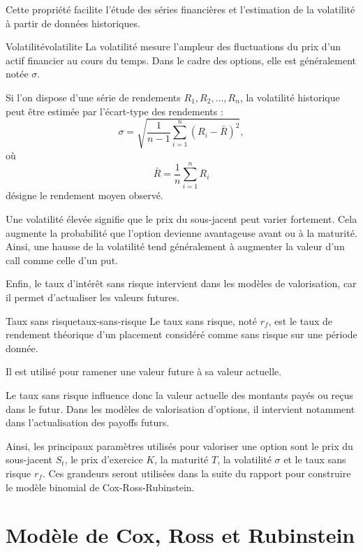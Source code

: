 \documentclass[11pt]{report}
\begin{document}
Cette propriété facilite l'étude des séries financières et l'estimation de la volatilité à partir de données historiques.
\begin{definition}{Volatilité}{volatilite}
La volatilité mesure l'ampleur des fluctuations du prix d'un actif financier au cours du temps. Dans le cadre des options, elle est généralement notée $\sigma$.

Si l'on dispose d'une série de rendements $R_1, R_2, \ldots, R_n$, la volatilité historique peut être estimée par l'écart-type des rendements :
\[
\sigma = \sqrt{\frac{1}{n-1}\sum_{i=1}^{n}(R_i-\bar R)^2},
\]
où
\[
\bar R = \frac{1}{n}\sum_{i=1}^{n} R_i
\]
désigne le rendement moyen observé.
\end{definition}

Une volatilité élevée signifie que le prix du sous-jacent peut varier fortement. Cela augmente la probabilité que l'option devienne avantageuse avant ou à la maturité. Ainsi, une hausse de la volatilité tend généralement à augmenter la valeur d'un call comme celle d'un put.

Enfin, le taux d'intérêt sans risque intervient dans les modèles de valorisation, car il permet d'actualiser les valeurs futures.

\begin{definition}{Taux sans risque}{taux-sans-risque}
Le taux sans risque, noté $r_f$, est le taux de rendement théorique d'un placement considéré comme sans risque sur une période donnée.

Il est utilisé pour ramener une valeur future à sa valeur actuelle.
\end{definition}

Le taux sans risque influence donc la valeur actuelle des montants payés ou reçus dans le futur. Dans les modèles de valorisation d'options, il intervient notamment dans l'actualisation des payoffs futurs.

Ainsi, les principaux paramètres utilisés pour valoriser une option sont le prix du sous-jacent $S_t$, le prix d'exercice $K$, la maturité $T$, la volatilité $\sigma$ et le taux sans risque $r_f$. Ces grandeurs seront utilisées dans la suite du rapport pour construire le modèle binomial de Cox-Ross-Rubinstein.
\newpage


\chapter{Modèle de Cox, Ross et Rubinstein}
\end{document}
